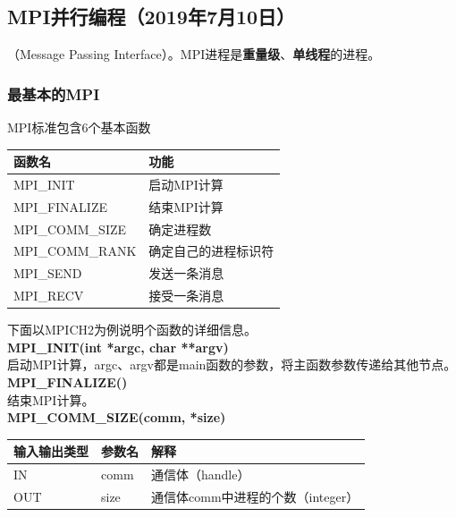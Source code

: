 \documentclass{article}
\begin{document}
			\subsection{MPI并行编程（2019年7月10日）}
				（Message Passing Interface）。MPI进程是\textbf{重量级}、\textbf{单线程}的进程。
				\subsubsection{最基本的MPI}
					MPI标准包含6个基本函数
					\begin{table}[H]
						\centering
						\begin{tabular}{ll}
							\hline
							函数名 & 功能\\
							\hline
							MPI\_INIT & 启动MPI计算\\
							MPI\_FINALIZE & 结束MPI计算\\
							MPI\_COMM\_SIZE & 确定进程数\\
							MPI\_COMM\_RANK & 确定自己的进程标识符\\
							MPI\_SEND & 发送一条消息\\
							MPI\_RECV & 接受一条消息\\
							\hline
						\end{tabular}
					\end{table}
					下面以MPICH2为例说明个函数的详细信息。
					\\\textbf{MPI\_INIT(int *argc, char **argv)}\\
						启动MPI计算，argc、argv都是main函数的参数，将主函数参数传递给其他节点。
					\\\textbf{MPI\_FINALIZE()}\\
						结束MPI计算。
					\\\textbf{MPI\_COMM\_SIZE(comm, *size)}\\
						\begin{table}[H]
							\centering
							\begin{tabular}{lll}
								\hline
								输入输出类型 & 参数名 & 解释\\
								\hline
								IN & comm & 通信体（handle）\\
								OUT & size & 通信体comm中进程的个数（integer）\\
								\hline
							\end{tabular}
						\end{table}
					
\end{document}
